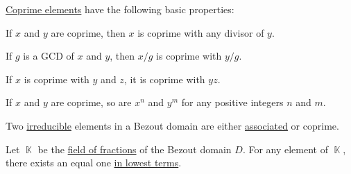\begin{proposition}\label{thm:def:coprime_elements}
  \hyperref[def:coprime_elements]{Coprime elements} have the following basic properties:
  \begin{thmenum}
     If \( x \) and \( y \) are coprime, then \( x \) is coprime with any divisor of \( y \).

     If \( g \) is a GCD of \( x \) and \( y \), then \( x / g \) is coprime with \( y / g \).

     If \( x \) is coprime with \( y \) and \( z \), it is coprime with \( yz \).

     If \( x \) and \( y \) are coprime, so are \( x^n \) and \( y^m \) for any positive integers \( n \) and \( m \).

     Two \hyperref[def:domain_divisibility/irreducible]{irreducible} elements in a Bezout domain are either \hyperref[def:domain_divisibility/associates]{associated} or coprime.

     Let \( \BbbK \) be the \hyperref[def:field_of_fractions]{field of fractions} of the Bezout domain \( D \). For any element of \( \BbbK \), there exists an equal one \hyperref[def:lowest_terms]{in lowest terms}.
  \end{thmenum}
\end{proposition}
